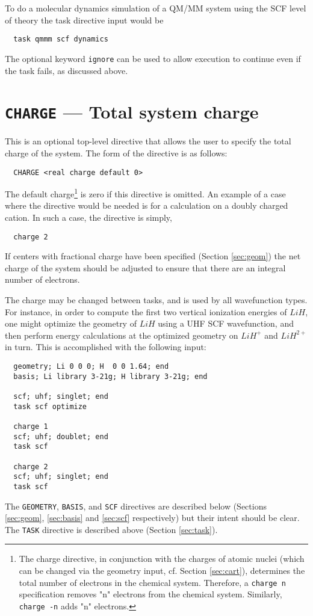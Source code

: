 To do a molecular dynamics simulation of a QM/MM system using the SCF
level of theory the task directive input would be
\begin{verbatim}
  task qmmm scf dynamics
\end{verbatim}

The optional keyword \verb+ignore+ can be used to allow execution to
continue even if the task fails, as discussed above.

\section{{\tt CHARGE} --- Total system charge}
\label{sec:charge}

This is an optional top-level directive that allows the user to specify
the total charge of the system.  The form of the directive is as follows:
\begin{verbatim}
  CHARGE <real charge default 0>
\end{verbatim}

The default charge\footnote{The charge directive, in conjunction with
  the charges of atomic nuclei (which can be changed via the geometry
  input, cf. Section \ref{sec:cart}), determines the total number of
  electrons in the chemical system.  Therefore, a {\tt charge n}
  specification removes "n" electrons from the chemical system.
  Similarly, {\tt charge -n} adds "n" electrons.} is zero
if this directive is omitted.  An example of a case where the
directive would be needed is for a calculation on a doubly charged
cation.  In such a case, the directive is simply,
\begin{verbatim}
  charge 2
\end{verbatim}

If centers with fractional charge have been specified (Section
\ref{sec:geom}) the net charge of the system should be adjusted to
ensure that there are an integral number of electrons.

The charge may be changed between tasks, and is used by all
wavefunction types.  For instance, in order to compute the first two
vertical ionization energies of $LiH$, one might optimize the geometry
of $LiH$ using a UHF SCF wavefunction, and then perform energy
calculations at the optimized geometry on $LiH^+$ and
$LiH^{2+}$ in turn.  This is accomplished with the following input:
\begin{verbatim}
  geometry; Li 0 0 0; H  0 0 1.64; end
  basis; Li library 3-21g; H library 3-21g; end

  scf; uhf; singlet; end
  task scf optimize

  charge 1
  scf; uhf; doublet; end
  task scf

  charge 2
  scf; uhf; singlet; end
  task scf
\end{verbatim}
The \verb+GEOMETRY+, \verb+BASIS+, and \verb+SCF+ directives are
described below (Sections \ref{sec:geom}, \ref{sec:basis} and
\ref{sec:scf} respectively) but their intent should be clear.  The
\verb+TASK+ directive is described above (Section \ref{sec:task}).  


